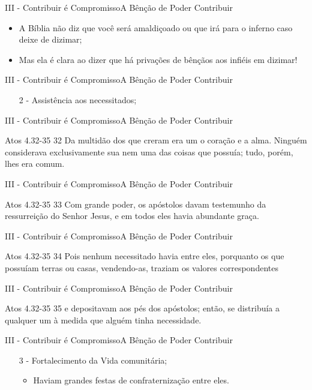 \documentclass[14pt,aspectratio=169]{beamer}
\newcommand{\TT}{A Bênção de Poder Contribuir}
\newcommand{\PIII}{III - Contribuir é Compromisso}
\begin{document}
\begin{frame}{\PIII}{\TT}
 \begin{itemize}
     \item A Bíblia não diz que você será amaldiçoado ou que irá para o inferno caso deixe de dizimar;\pause
     \item Mas ela é clara ao dizer que há privações de bênçãos aos infiéis em dizimar!
 \end{itemize}
\end{frame}

\begin{frame}{\PIII}{\TT}
 \begin{enumerate}
  \item[2 -] Assistência aos necessitados;
 \end{enumerate}
\end{frame}

\begin{frame}{\PIII}{\TT}
 \begin{block}{Atos 4.32-35}
32 Da multidão dos que creram era um o coração e a alma. Ninguém considerava exclusivamente sua nem uma das coisas que possuía; tudo, porém, lhes era comum.
 \end{block}
\end{frame}

\begin{frame}{\PIII}{\TT}
 \begin{block}{Atos 4.32-35}
33 Com grande poder, os apóstolos davam testemunho da ressurreição do Senhor Jesus, e em todos eles havia abundante graça.
 \end{block}
\end{frame}

\begin{frame}{\PIII}{\TT}
 \begin{block}{Atos 4.32-35}
34 Pois nenhum necessitado havia entre eles, porquanto os que possuíam terras ou casas, vendendo-as, traziam os valores correspondentes
 \end{block}
\end{frame}

\begin{frame}{\PIII}{\TT}
 \begin{block}{Atos 4.32-35}
35 e depositavam aos pés dos apóstolos; então, se distribuía a qualquer um à medida que alguém tinha necessidade.
 \end{block}
\end{frame}

\begin{frame}{\PIII}{\TT}
 \begin{enumerate}
  \item[3 -] Fortalecimento da Vida comunitária;\pause
  \begin{itemize}
   \Large
   \item Haviam grandes festas de confraternização entre eles.
  \end{itemize}
 \end{enumerate}
\end{frame}
\end{document}
